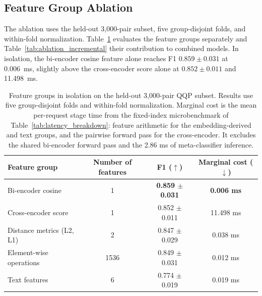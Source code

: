 \documentclass[authoryear,preprint,review,12pt]{elsarticle}
\begin{document}
\subsection{Feature Group Ablation}
\label{subsec:ablation}
The ablation uses the held-out 3,000-pair subset, five group-disjoint folds, and within-fold normalization. Table~\ref{tab:ablation_isolation} evaluates the feature groups separately and Table~\ref{tab:ablation_incremental} their contribution to combined models. In isolation, the bi-encoder cosine feature alone reaches F1 $0.859\pm0.031$ at 0.006~ms, slightly above the cross-encoder score alone at $0.852\pm0.011$ and 11.498~ms.

\begin{table}[htbp]
\centering
\caption{Feature groups in isolation on the held-out 3,000-pair QQP subset. Results use five group-disjoint folds and within-fold normalization. Marginal cost is the mean per-request stage time from the fixed-index microbenchmark of Table~\ref{tab:latency_breakdown}: feature arithmetic for the embedding-derived and text groups, and the pairwise forward pass for the cross-encoder. It excludes the shared bi-encoder forward pass and the 2.86 ms of meta-classifier inference.}
\label{tab:ablation_isolation}
\footnotesize
\begin{tabular}{lccc}
\toprule
Feature group & Number of features & F1 ($\uparrow$) & Marginal cost ($\downarrow$) \\
\midrule
Bi-encoder cosine & 1 & \textbf{0.859 $\pm$ 0.031} & \textbf{0.006 ms} \\
Cross-encoder score & 1 & 0.852 $\pm$ 0.011 & 11.498 ms \\
Distance metrics (L2, L1) & 2 & 0.847 $\pm$ 0.029 & 0.038 ms \\
Element-wise operations & 1536 & 0.849 $\pm$ 0.031 & 0.012 ms \\
Text features & 6 & 0.774 $\pm$ 0.019 & 0.019 ms \\
\bottomrule
\end{tabular}
\end{table}
\end{document}

